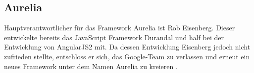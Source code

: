 \subsection{Aurelia}
\label{sec:aurelia}

Hauptverantwortlicher für das Framework Aurelia ist Rob Eisenberg. Dieser entwickelte bereits das JavaScript Framework Durandal und half bei der Entwicklung von AngularJS2 mit. Da dessen Entwicklung Eisenberg jedoch nicht zufrieden stellte, entschloss er sich, das Google-Team zu verlassen und erneut ein neues Framework unter dem Namen Aurelia zu kreieren \cite{Eisenberg2014}.








